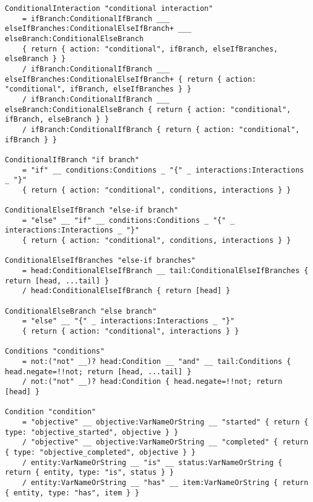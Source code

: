 \newpage
\begin{lstlisting}[language=PEG, label={app:pca:grammar3}, caption={The pca Language Grammar}]
ConditionalInteraction "conditional interaction"
	= ifBranch:ConditionalIfBranch ___ elseIfBranches:ConditionalElseIfBranch+ ___ elseBranch:ConditionalElseBranch
	{ return { action: "conditional", ifBranch, elseIfBranches, elseBranch } }
	/ ifBranch:ConditionalIfBranch ___ elseIfBranches:ConditionalElseIfBranch+ { return { action: "conditional", ifBranch, elseIfBranches } }
	/ ifBranch:ConditionalIfBranch ___ elseBranch:ConditionalElseBranch	{ return { action: "conditional", ifBranch, elseBranch } }
	/ ifBranch:ConditionalIfBranch { return { action: "conditional", ifBranch } }

ConditionalIfBranch "if branch"
	= "if" __ conditions:Conditions _ "{" _ interactions:Interactions _ "}"
	{ return { action: "conditional", conditions, interactions } }

ConditionalElseIfBranch "else-if branch"
	= "else" __ "if" __ conditions:Conditions _ "{" _ interactions:Interactions _ "}"
	{ return { action: "conditional", conditions, interactions } }

ConditionalElseIfBranches "else-if branches"
	= head:ConditionalElseIfBranch __ tail:ConditionalElseIfBranches { return [head, ...tail] }
    / head:ConditionalElseIfBranch { return [head] }

ConditionalElseBranch "else branch"
	= "else" __ "{" _ interactions:Interactions _ "}"
	{ return { action: "conditional", interactions } }

Conditions "conditions"
	= not:("not" __)? head:Condition __ "and" __ tail:Conditions { head.negate=!!not; return [head, ...tail] }
    / not:("not" __)? head:Condition { head.negate=!!not; return [head] }

Condition "condition"
	= "objective" __ objective:VarNameOrString __ "started" { return { type: "objective_started", objective } }
	/ "objective" __ objective:VarNameOrString __ "completed" { return { type: "objective_completed", objective } }
	/ entity:VarNameOrString __ "is" __ status:VarNameOrString { return { entity, type: "is", status } }
	/ entity:VarNameOrString __ "has" __ item:VarNameOrString { return { entity, type: "has", item } }


\end{lstlisting}
